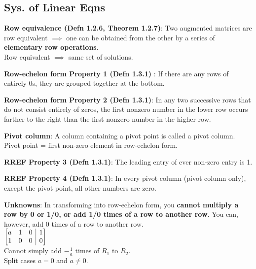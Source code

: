 \documentclass[a4paper,landscape]{article}
\newcommand{\rntopic}[1]{\vspace{-2.0em}\subsection*{#1}\vspace{-1.0em}}
\newcommand{\rnname}[1]{\textbf{#1}}
\begin{document}
\footnotesize
\vspace*{-\baselineskip}\leavevmode
\vspace{-1.2cm}

\begin{multicols*}{4}

\raggedright

\rntopic{Sys. of Linear Eqns}


\begin{flatitemize}
\item \rnname{Row equivalence (Defn 1.2.6, Theorem 1.2.7)}: Two augmented matrices are row equivalent $\implies$ one can be obtained from the other by a series of \textbf{elementary row operations}. \\ Row equivalent $\implies$ same set of solutions.
\item \rnname{Row-echelon form Property 1 (Defn 1.3.1) }: If there are any rows of entirely 0s, they are grouped together at the bottom. \\
\item \rnname{Row-echelon form Property 2 (Defn 1.3.1)}: In any two successive rows that do not consist entirely of zeros, the first nonzero number in the lower row occurs farther to the right than the first nonzero number in the higher row.\\

\item \rnname{Pivot column}: A column containing a pivot point is called a pivot column. Pivot point = first non-zero element in row-echelon form.
\item \rnname{RREF Property 3 (Defn 1.3.1)}: The leading entry of ever non-zero entry is 1.\\

\item \rnname{RREF Property 4 (Defn 1.3.1)}: In every pivot column (pivot column only), except the pivot point, all other numbers are zero.\\


\item \rnname{Unknowns}: In transforming into row-echelon form, you \textbf{cannot multiply a row by 0 or 1/0, or add 1/0 times of a row to another row}. You can, however, add 0 times of a row to another row.\\
$\left[
\begin{array}{@{}ccc|c@{}}
a & 1 & 0 & 1 \\
1 & 0 & 0 & 0 \\
\end{array}
\right]$ \\
Cannot simply add $-\frac{1}{a}$ times of $R_{1}$ to $R_{2}$.\\Split cases $a=0$ and $a\neq0$.


\end{flatitemize}
\end{multicols*}
\end{document}
